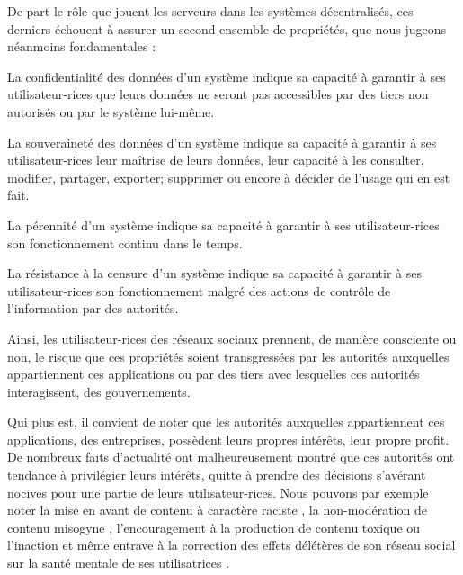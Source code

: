 De part le rôle que jouent les serveurs dans les systèmes décentralisés, ces derniers échouent à assurer un second ensemble de propriétés, que nous jugeons néanmoins fondamentales :
\begin{definition}
  \label{def:confidentialite}
  La confidentialité des données d'un système indique sa capacité à garantir à ses utilisateur-rices que leurs données ne seront pas accessibles par des tiers non autorisés ou par le système lui-même.
\end{definition}
\begin{definition}
  \label{def:souverainete}
  La souveraineté des données d'un système indique sa capacité à garantir à ses utilisateur-rices leur maîtrise de leurs données, \ie leur capacité à les consulter, modifier, partager, exporter; supprimer ou encore à décider de l'usage qui en est fait.
\end{definition}
\begin{definition}[Pérennité]
  \label{def:perennite}
  La pérennité d'un système indique sa capacité à garantir à ses utilisateur-rices son fonctionnement continu dans le temps.
\end{definition}
\begin{definition}
  \label{def:censorship}
  La résistance à la censure d'un système indique sa capacité à garantir à ses utilisateur-rices son fonctionnement malgré des actions de contrôle de l'information par des autorités.
\end{definition}
Ainsi, les utilisateur-rices des réseaux sociaux prennent, de manière consciente ou non, le risque que ces propriétés soient transgressées par les autorités auxquelles appartiennent ces applications ou par des tiers avec lesquelles ces autorités interagissent, \eg des gouvernements.

Qui plus est, il convient de noter que les autorités auxquelles appartiennent ces applications, \eg des entreprises, possèdent leurs propres intérêts, \eg leur propre profit.
De nombreux faits d'actualité ont malheureusement montré que ces autorités ont tendance à privilégier leurs intérêts, quitte à prendre des décisions s'avérant nocives pour une partie de leurs utilisateur-rices.
Nous pouvons par exemple noter la mise en avant de contenu à caractère raciste \cite{2018-algorithms-oppression-noble}, la non-modération de contenu misogyne \cite{2018-violence-abuse-against-women-amnesty}, l'encouragement à la production de contenu toxique \cite{2021-facebook-files-algorithm-favoring-toxicity-wsj} ou l'inaction et même entrave à la correction des effets délétères de son réseau social sur la santé mentale de ses utilisatrices \cite{2021-facebook-files-instagram-toxic-teen-girls-wsj}.

